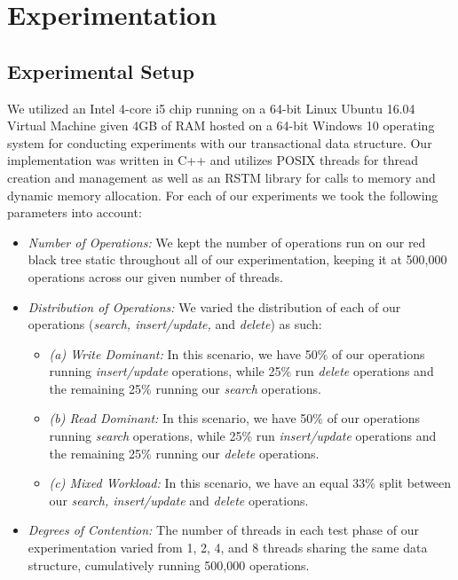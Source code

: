\documentclass[letterpaper, 10 pt, conference]{ieeeconf}
\begin{document}
\section{Experimentation}
\subsection{Experimental Setup}
We utilized an Intel 4-core i5 chip running on a 64-bit Linux Ubuntu 16.04 Virtual Machine given 4GB of RAM hosted on a 64-bit Windows 10 operating system for conducting experiments with our transactional data structure. Our implementation was written in C++ and utilizes POSIX threads for thread creation and management as well as an RSTM library for calls to memory and dynamic memory allocation. For each of our experiments we took the following parameters into account:
\begin{itemize}
	\item \textit{Number of Operations:} We kept the number of operations run on our red black tree static throughout all of our experimentation, keeping it at 500,000 operations across our given number of threads.
	\item \textit{Distribution of Operations:} We varied the distribution of each of our operations (\textit{search, insert/update,} and \textit{delete}) as such:
	\begin{itemize}
		\item \textit{(a) Write Dominant:} In this scenario, we have 50\% of our operations running \textit{insert/update} operations, while 25\% run \textit{delete} operations and the remaining 25\% running our \textit{search} operations.
		\item \textit{(b) Read Dominant:} In this scenario, we have 50\% of our operations running \textit{search} operations, while 25\% run \textit{insert/update} operations and the remaining 25\% running our \textit{delete} operations.
		\item \textit{(c) Mixed Workload:} In this scenario, we have an equal 33\% split between our \textit{search, insert/update} and \textit{delete} operations.
	\end{itemize}
	\item \textit{Degrees of Contention:} The number of threads in each test phase of our experimentation varied from 1, 2, 4, and 8 threads sharing the same data structure, cumulatively running 500,000 operations.
\end{itemize}
\end{document}
